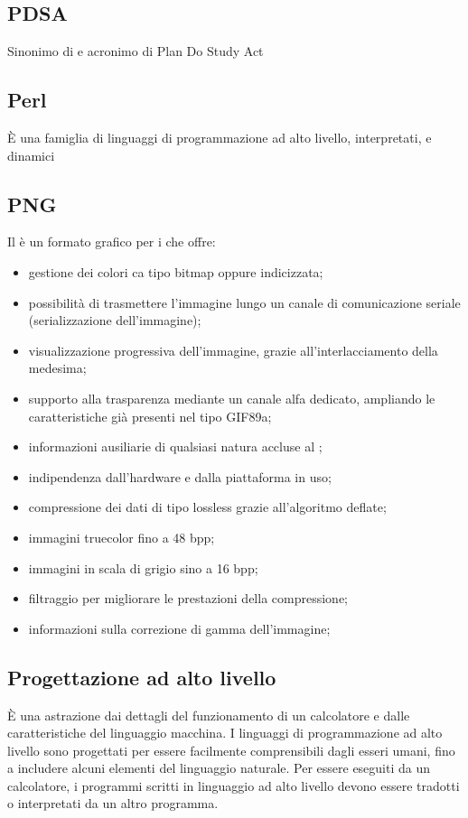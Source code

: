 {{		\subsection{PDSA}
		Sinonimo di  e acronimo di Plan Do Study Act


		\subsection{Perl}
		È una famiglia di linguaggi di programmazione ad alto livello, interpretati, e dinamici


		\subsection{PNG}
		Il  è un formato grafico per i  che offre:
  			\begin{itemize}
    		\item gestione dei colori ca tipo bitmap oppure indicizzata;
    		\item possibilità di trasmettere l'immagine lungo un canale di comunicazione seriale (serializzazione dell'immagine);
   			\item visualizzazione progressiva dell'immagine, grazie all'interlacciamento della medesima;
    		\item supporto alla trasparenza mediante un canale alfa dedicato, ampliando le caratteristiche già presenti nel tipo GIF89a;
    		\item informazioni ausiliarie di qualsiasi natura accluse al ;
    		\item indipendenza dall'hardware e dalla piattaforma in uso;
    		\item compressione dei dati di tipo lossless grazie all'algoritmo deflate;
    		\item immagini truecolor fino a 48 bpp;
    		\item immagini in scala di grigio sino a 16 bpp;
    		\item filtraggio per migliorare le prestazioni della compressione;
    		\item informazioni sulla correzione di gamma dell'immagine;
  			\end{itemize}
  			

		\subsection{Progettazione ad alto livello}
		È una astrazione dai dettagli del funzionamento di un calcolatore e dalle caratteristiche del linguaggio macchina. I linguaggi di programmazione ad alto livello sono progettati per essere facilmente comprensibili dagli esseri umani, fino a includere alcuni elementi del linguaggio naturale. Per essere eseguiti da un calcolatore, i programmi scritti in linguaggio ad alto livello devono essere tradotti o interpretati da un altro programma.

}}
